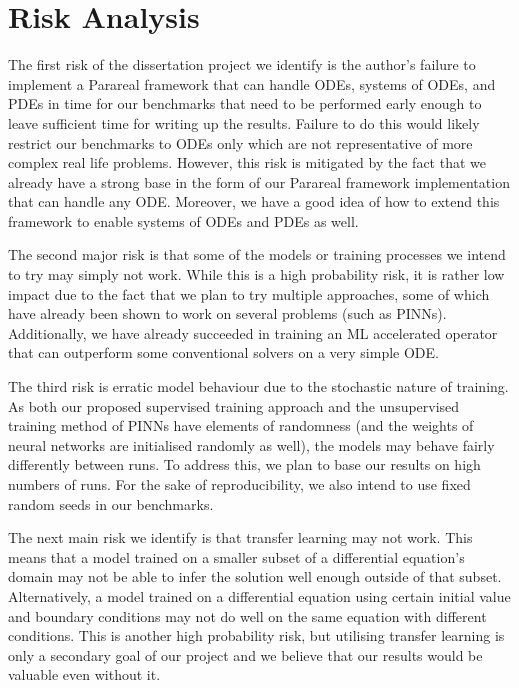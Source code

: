 \documentclass{article}
\begin{document}
\section{Risk Analysis}

The first risk of the dissertation project we identify is the author's failure to implement a Parareal framework that can handle ODEs, systems of ODEs, and PDEs in time for our benchmarks that need to be performed early enough to leave sufficient time for writing up the results. Failure to do this would likely restrict our benchmarks to ODEs only which are not representative of more complex real life problems. However, this risk is mitigated by the fact that we already have a strong base in the form of our Parareal framework implementation that can handle any ODE. Moreover, we have a good idea of how to extend this framework to enable systems of ODEs and PDEs as well.

The second major risk is that some of the models or training processes we intend to try may simply not work. While this is a high probability risk, it is rather low impact due to the fact that we plan to try multiple approaches, some of which have already been shown to work on several problems (such as PINNs). Additionally, we have already succeeded in training an ML accelerated operator that can outperform some conventional solvers on a very simple ODE.

The third risk is erratic model behaviour due to the stochastic nature of training. As both our proposed supervised training approach and the unsupervised training method of PINNs have elements of randomness (and the weights of neural networks are initialised randomly as well), the models may behave fairly differently between runs. To address this, we plan to base our results on high numbers of runs. For the sake of reproducibility, we also intend to use fixed random seeds in our benchmarks.

The next main risk we identify is that transfer learning may not work. This means that a model trained on a smaller subset of a differential equation's domain may not be able to infer the solution well enough outside of that subset. Alternatively, a model trained on a differential equation using certain initial value and boundary conditions may not do well on the same equation with different conditions. This is another high probability risk, but utilising transfer learning is only a secondary goal of our project and we believe that our results would be valuable even without it.
\end{document}
